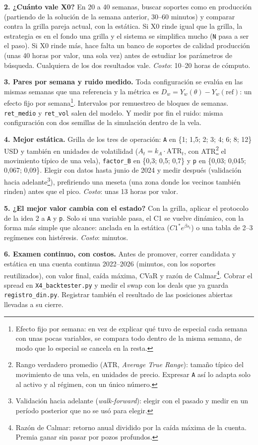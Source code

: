 \documentclass[11pt,a4paper]{article}
\newcommand{\code}[1]{\texttt{\small #1}}
\begin{document}
\textbf{2. ¿Cuánto vale X0?} En 20 a 40 semanas, buscar soportes como en producción (partiendo de la
solución de la semana anterior, 30--60 minutos) y comparar contra la grilla pareja actual, con la estática.
Si X0 rinde igual que la grilla, la estrategia es en el fondo una grilla y el sistema se simplifica mucho
(\code{N} pasa a ser el paso). Si X0 rinde más, hace falta un banco de soportes de calidad producción
(unas 40 horas por valor, una sola vez) antes de estudiar los parámetros de búsqueda. Cualquiera de los dos
resultados vale. \emph{Costo}: 10--20 horas de cómputo.

\textbf{3. Pares por semana y ruido medido.} Toda configuración se evalúa en las mismas semanas que una
referencia y la métrica es $D_w = Y_w(\theta) - Y_w(\text{ref})$: un efecto fijo por
semana\footnote{Efecto fijo por semana: en vez de explicar qué tuvo de especial cada semana con unas pocas
variables, se compara todo dentro de la misma semana, de modo que lo especial se cancela en la resta.}.
Intervalos por remuestreo de bloques de semanas. \code{ret\_medio} y \code{ret\_vol} salen del modelo. Y
medir por fin el ruido: misma configuración con dos semillas de la simulación dentro de la vela.

\textbf{4. Mejor estática.} Grilla de los tres de operación: \code{A} en \{1; 1,5; 2; 3; 4; 6; 8; 12\} USD
y también en unidades de volatilidad ($A_t = k_A \cdot \text{ATR}_t$, con ATR\footnote{Rango verdadero
promedio (ATR, \emph{Average True Range}): tamaño típico del movimiento de una vela, en unidades de precio.
Expresar \code{A} así lo adapta solo al activo y al régimen, con un único número.} el movimiento típico de
una vela), \code{factor\_B} en \{0,3; 0,5; 0,7\} y \code{p} en \{0,03; 0,045; 0,067; 0,09\}. Elegir con datos
hasta junio de 2024 y medir después (validación hacia adelante\footnote{Validación hacia adelante
(\emph{walk-forward}): elegir con el pasado y medir en un período posterior que no se usó para elegir.}),
prefiriendo una meseta (una zona donde los vecinos también rinden) antes que el pico. \emph{Costo}: unas
13 horas por valor.

\textbf{5. ¿El mejor valor cambia con el estado?} Con la grilla, aplicar el protocolo de la idea 2 a
\code{A} y \code{p}. Solo si una variable pasa, el C1 se vuelve dinámico, con la forma más simple que
alcance: anclada en la estática ($C1^{*}e^{\beta s_t}$) o una tabla de 2--3 regímenes con histéresis.
\emph{Costo}: minutos.

\textbf{6. Examen continuo, con costos.} Antes de promover, correr candidata y estática en una cuenta
continua 2022--2026 (minutos, con los soportes reutilizados), con valor final, caída máxima, CVaR y razón
de Calmar\footnote{Razón de Calmar: retorno anual dividido por la caída máxima de la cuenta. Premia ganar
sin pasar por pozos profundos.}. Cobrar el spread en \code{X4\_backtester.py} y medir el swap con los deals
que ya guarda \code{registro\_din.py}. Registrar también el resultado de las posiciones abiertas llevadas a
su cierre.
\end{document}
